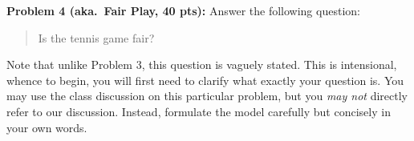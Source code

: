 \documentclass[12pt]{article}
\begin{document}
\vskip0.25in
\noindent\textbf{Problem 4 (aka.\ Fair Play, 40 pts):}
Answer the following question:
\begin{verse}
Is the tennis game fair?
\end{verse}
Note that unlike Problem 3, this question is vaguely stated.
This is intensional, whence to begin, you will first need to clarify
what exactly your question is.
You may use the class discussion on this particular 
problem, but you \emph{may not} directly refer to our 
discussion.  Instead, formulate the model carefully but concisely in 
your own words.   
\end{document}
